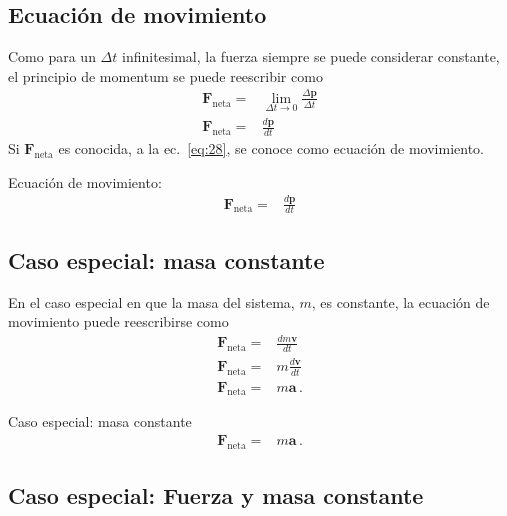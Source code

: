 \subsection{Ecuación de movimiento}


Como para un $\Delta t$ infinitesimal, la fuerza siempre se puede considerar constante, el principio de momentum se puede reescribir como
\begin{align}
  \label{eq:28}
  \mathbf{F}_{\text{neta}}=&\lim_{\Delta t\to 0}\frac{\Delta\mathbf{p}}{\Delta t}\nonumber\\
 \mathbf{F}_{\text{neta}}=&\frac{d\mathbf{p} }{dt}
\end{align}
Si $\mathbf{F}_{\text{neta}}$ es conocida, a la ec.~\eqref{eq:28}, se conoce como ecuación de movimiento.

\begin{frame}
  \begin{block}%
{Ecuación de movimiento:}
  \begin{align*}
   \mathbf{F}_{\text{neta}}=&\frac{d\mathbf{p} }{dt}
   \end{align*}
  \end{block}
\end{frame}



\subsection{Caso especial: masa constante}
En el caso especial en que la masa del sistema, $m$, es constante, la ecuación de movimiento puede reescribirse como
\begin{align}
   \mathbf{F}_{\text{neta}}=&\frac{d m\mathbf{v} }{dt}\nonumber\\
   \mathbf{F}_{\text{neta}}=&m\frac{d \mathbf{v} }{dt}\nonumber\\
   \mathbf{F}_{\text{neta}}=&m\mathbf{a}\,.
\end{align}

\begin{frame}
  \begin{block}%
{Caso especial: masa constante}
\begin{align}
   \mathbf{F}_{\text{neta}}=&m\mathbf{a}\,.
\end{align}
\end{block}
\end{frame}

\subsection{Caso especial: Fuerza y masa constante}

